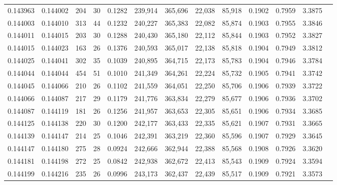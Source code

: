 \begin{tabular}{rrrrrrrrrrrrr}
0.143963 & 0.144002 &   204 &  30 &                                     0.1282 & 239,914 & 365,696 &  22,038 &  85,918 & 0.1902 & 0.7959 & 3.3875 \\
0.144003 & 0.144010 &   313 &  44 &                                     0.1232 & 240,227 & 365,383 &  22,082 &  85,874 & 0.1903 & 0.7955 & 3.3846 \\
0.144011 & 0.144015 &   203 &  30 &                                     0.1288 & 240,430 & 365,180 &  22,112 &  85,844 & 0.1903 & 0.7952 & 3.3827 \\
0.144015 & 0.144023 &   163 &  26 &                                     0.1376 & 240,593 & 365,017 &  22,138 &  85,818 & 0.1904 & 0.7949 & 3.3812 \\
0.144025 & 0.144041 &   302 &  35 &                                     0.1039 & 240,895 & 364,715 &  22,173 &  85,783 & 0.1904 & 0.7946 & 3.3784 \\
0.144044 & 0.144044 &   454 &  51 &                                     0.1010 & 241,349 & 364,261 &  22,224 &  85,732 & 0.1905 & 0.7941 & 3.3742 \\
0.144045 & 0.144066 &   210 &  26 &                                     0.1102 & 241,559 & 364,051 &  22,250 &  85,706 & 0.1906 & 0.7939 & 3.3722 \\
0.144066 & 0.144087 &   217 &  29 &                                     0.1179 & 241,776 & 363,834 &  22,279 &  85,677 & 0.1906 & 0.7936 & 3.3702 \\
0.144087 & 0.144119 &   181 &  26 &                                     0.1256 & 241,957 & 363,653 &  22,305 &  85,651 & 0.1906 & 0.7934 & 3.3685 \\
0.144125 & 0.144138 &   220 &  30 &                                     0.1200 & 242,177 & 363,433 &  22,335 &  85,621 & 0.1907 & 0.7931 & 3.3665 \\
0.144139 & 0.144147 &   214 &  25 &                                     0.1046 & 242,391 & 363,219 &  22,360 &  85,596 & 0.1907 & 0.7929 & 3.3645 \\
0.144147 & 0.144180 &   275 &  28 &                                     0.0924 & 242,666 & 362,944 &  22,388 &  85,568 & 0.1908 & 0.7926 & 3.3620 \\
0.144181 & 0.144198 &   272 &  25 &                                     0.0842 & 242,938 & 362,672 &  22,413 &  85,543 & 0.1909 & 0.7924 & 3.3594 \\
0.144199 & 0.144216 &   235 &  26 &                                     0.0996 & 243,173 & 362,437 &  22,439 &  85,517 & 0.1909 & 0.7921 & 3.3573 \\

\end{tabular}
